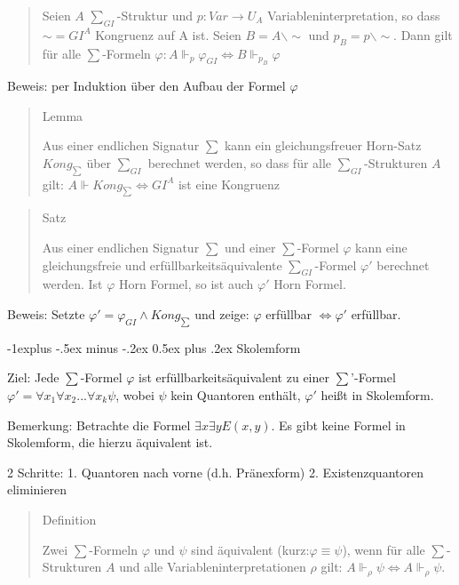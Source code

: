 \documentclass[a4paper]{article}
\makeatletter
\renewcommand{\subsection}{\@startsection{subsection}{2}{0mm}%
                {-1explus -.5ex minus -.2ex}%
                {0.5ex plus .2ex}%
                {\normalfont\normalsize\bfseries}}
\makeatother
\begin{document}
\begin{multicols}{3}
\begin{quote}
    Seien $A$ $\sum_{GI}$-Struktur und $p:Var\rightarrow U_A$
    Variableninterpretation, so dass $\sim=GI^A$ Kongruenz auf A ist. Seien
    $B=A\backslash\sim$ und $p_B=p\backslash\sim$. Dann gilt für alle
    $\sum$-Formeln
    $\varphi: A\Vdash_p \varphi_{GI} \Leftrightarrow B\Vdash_{p_B} \varphi$
  \end{quote}

  Beweis: per Induktion über den Aufbau der Formel $\varphi$

  \begin{quote}
    Lemma

    Aus einer endlichen Signatur $\sum$ kann ein gleichungsfreuer Horn-Satz
    $Kong_{\sum}$ über $\sum_{GI}$ berechnet werden, so dass für alle
    $\sum_{GI}$-Strukturen $A$ gilt:
    $A\Vdash Kong_{\sum} \Leftrightarrow GI^A$ ist eine Kongruenz
  \end{quote}

  \begin{quote}
    Satz

    Aus einer endlichen Signatur $\sum$ und einer $\sum$-Formel $\varphi$
    kann eine gleichungsfreie und erfüllbarkeitsäquivalente
    $\sum_{GI}$-Formel $\varphi'$ berechnet werden. Ist $\varphi$ Horn
    Formel, so ist auch $\varphi'$ Horn Formel.
  \end{quote}

  Beweis: Setzte $\varphi' =\varphi_{GI}\wedge Kong_{\sum}$ und zeige:
  $\varphi$ erfüllbar $\Leftrightarrow \varphi'$ erfüllbar.

  \subsection{Skolemform}\label{skolemform}

  Ziel: Jede $\sum$-Formel $\varphi$ ist erfüllbarkeitsäquivalent zu einer
  $\sum$'-Formel $\varphi'=\forall x_1\forall x_2 ...\forall x_k \psi$,
  wobei $\psi$ kein Quantoren enthält, $\varphi'$ heißt in Skolemform.

  Bemerkung: Betrachte die Formel $\exists x\exists y E(x,y)$. Es gibt
  keine Formel in Skolemform, die hierzu äquivalent ist.

  2 Schritte: 1. Quantoren nach vorne (d.h. Pränexform) 2.
  Existenzquantoren eliminieren

  \begin{quote}
    Definition

    Zwei $\sum$-Formeln $\varphi$ und $\psi$ sind äquivalent
    (kurz:$\varphi\equiv\psi$), wenn für alle $\sum$-Strukturen $A$ und alle
    Variableninterpretationen $\rho$ gilt:
    $A\Vdash_{\rho} \psi \Leftrightarrow A\Vdash_{\rho}\psi$.
  \end{quote}


\end{multicols}
\end{document}
